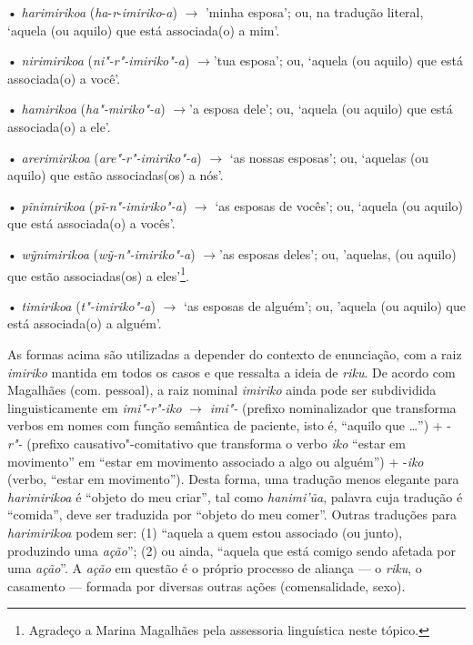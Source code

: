 • \emph{harimirikoa} (\emph{ha}-\emph{r}-\emph{imiriko}-\emph{a}) $\rightarrow$
'minha esposa'; ou, na tradução literal, `aquela (ou aquilo) que está
associada(o) a mim'.

• \emph{nirimirikoa} (\emph{ni"-r"-imiriko"-a}) $\rightarrow$'tua esposa'; ou, `aquela
(ou aquilo) que está associada(o) a você'.

• \emph{hamirikoa} (\emph{ha"-miriko"-a}) $\rightarrow$'a esposa dele'; ou, `aquela
(ou aquilo) que está associada(o) a ele'.

• \emph{arerimirikoa} (\emph{are"-r"-imiriko"-a}) $\rightarrow$ `as nossas esposas';
ou, `aquelas (ou aquilo) que estão associadas(os) a nós'.

• \emph{pĩnimirikoa} (\emph{pĩ-n"-imiriko"-a}) $\rightarrow$ `as esposas de vocês';
ou, `aquela (ou aquilo) que está associada(o) a vocês'.

• \emph{wỹnimirikoa} (\emph{wỹ-n"-imiriko"-a}) $\rightarrow$'as esposas deles'; ou,
'aquelas, (ou aquilo) que estão associadas(os) a eles'\footnote{Agradeço
  a Marina Magalhães pela assessoria linguística neste tópico.}.

• \emph{timirikoa} (\emph{t"-imiriko"-a}) $\rightarrow$ `as esposas de alguém'; ou,
'aquela (ou aquilo) que está associada(o) a alguém'.

As formas acima são utilizadas a depender do contexto de enunciação, com
a raiz \emph{imiriko} mantida em todos os casos e que ressalta a ideia
de \emph{riku}. De acordo com Magalhães (com. pessoal), a raiz nominal
\emph{imiriko} ainda pode ser subdividida linguisticamente em
\emph{{imi"-r"-iko}} $\rightarrow$ \emph{imi"-} (prefixo nominalizador que transforma
verbos em nomes com função semântica de paciente, isto é, ``aquilo que
\ldots{}'') + -\emph{r"-} (prefixo causativo"-comitativo que transforma o verbo
\emph{iko} ``estar em movimento'' em ``estar em movimento associado a algo
ou alguém'') + -\emph{iko} (verbo, ``estar em movimento''). Desta forma,
uma tradução menos elegante para \emph{harimirikoa} é ``objeto do meu
criar'', tal como \emph{hanimi'ũa}, palavra cuja tradução é ``comida'',
deve ser traduzida por ``objeto do meu comer''. Outras traduções para
\emph{harimirikoa} podem ser: (1) ``aquela a quem estou associado (ou
junto), produzindo uma \emph{ação}''; (2) ou ainda, ``aquela que está
comigo sendo afetada por uma \emph{ação}''. A \emph{ação} em questão é o
próprio processo de aliança --- o \emph{riku}, o casamento --- formada por
diversas outras ações (comensalidade, sexo).

